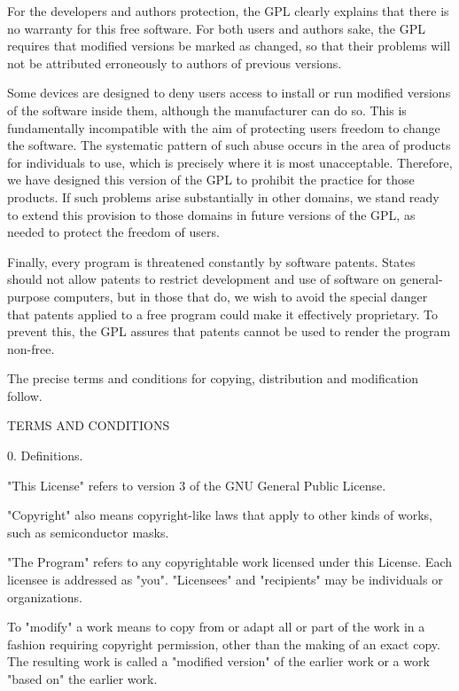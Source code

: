 For the developers\textquotesingle{} and authors\textquotesingle{} protection, the GPL clearly explains that there is no warranty for this free software. For both users\textquotesingle{} and authors\textquotesingle{} sake, the GPL requires that modified versions be marked as changed, so that their problems will not be attributed erroneously to authors of previous versions.

Some devices are designed to deny users access to install or run modified versions of the software inside them, although the manufacturer can do so. This is fundamentally incompatible with the aim of protecting users\textquotesingle{} freedom to change the software. The systematic pattern of such abuse occurs in the area of products for individuals to use, which is precisely where it is most unacceptable. Therefore, we have designed this version of the GPL to prohibit the practice for those products. If such problems arise substantially in other domains, we stand ready to extend this provision to those domains in future versions of the GPL, as needed to protect the freedom of users.

Finally, every program is threatened constantly by software patents. States should not allow patents to restrict development and use of software on general-\/purpose computers, but in those that do, we wish to avoid the special danger that patents applied to a free program could make it effectively proprietary. To prevent this, the GPL assures that patents cannot be used to render the program non-\/free.

The precise terms and conditions for copying, distribution and modification follow. \begin{DoxyVerb}                   TERMS AND CONDITIONS
\end{DoxyVerb}
 0. Definitions.

"{}\+This License"{} refers to version 3 of the GNU General Public License.

"{}\+Copyright"{} also means copyright-\/like laws that apply to other kinds of works, such as semiconductor masks.

"{}\+The Program"{} refers to any copyrightable work licensed under this License. Each licensee is addressed as "{}you"{}. "{}\+Licensees"{} and "{}recipients"{} may be individuals or organizations.

To "{}modify"{} a work means to copy from or adapt all or part of the work in a fashion requiring copyright permission, other than the making of an exact copy. The resulting work is called a "{}modified version"{} of the earlier work or a work "{}based on"{} the earlier work.

